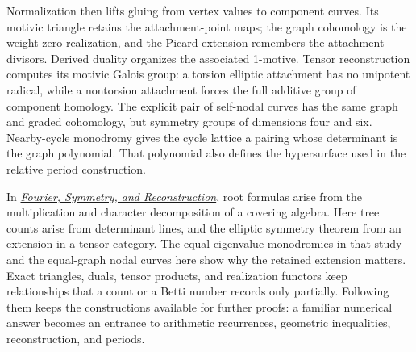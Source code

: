 \documentclass[11pt]{article}
\theoremstyle{definition}
\theoremstyle{remark}
\begin{document}
Normalization then lifts gluing from vertex values to component curves. Its motivic triangle retains the attachment-point maps; the graph cohomology is the weight-zero realization, and the Picard extension remembers the attachment divisors. Derived duality organizes the associated 1-motive. Tensor reconstruction computes its motivic Galois group: a torsion elliptic attachment has no unipotent radical, while a nontorsion attachment forces the full additive group of component homology. The explicit pair of self-nodal curves has the same graph and graded cohomology, but symmetry groups of dimensions four and six. Nearby-cycle monodromy gives the cycle lattice a pairing whose determinant is the graph polynomial. That polynomial also defines the hypersurface used in the relative period construction.

In \href{https://tensorgami.com/notes/fourier-symmetry-and-reconstruction}{\emph{Fourier, Symmetry, and Reconstruction}}, root formulas arise from the multiplication and character decomposition of a covering algebra. Here tree counts arise from determinant lines, and the elliptic symmetry theorem from an extension in a tensor category. The equal-eigenvalue monodromies in that study and the equal-graph nodal curves here show why the retained extension matters. Exact triangles, duals, tensor products, and realization functors keep relationships that a count or a Betti number records only partially. Following them keeps the constructions available for further proofs: a familiar numerical answer becomes an entrance to arithmetic recurrences, geometric inequalities, reconstruction, and periods.
\end{document}
